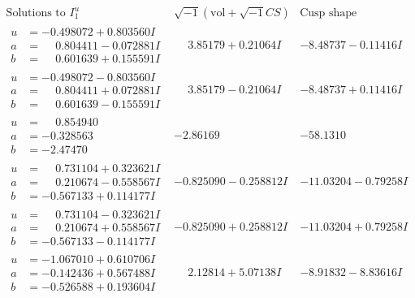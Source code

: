 \documentclass[1p]{elsarticle_modified}
\theoremstyle{definition}
\newcommand{\I}{\sqrt{-1}}
\begin{document}
$$\begin{array}{c|c|c}  
\text{Solutions to }I^u_{1}& \I (\text{vol} + \sqrt{-1}CS) & \text{Cusp shape}\\
 \hline 
\begin{aligned}
u &= -0.498072 + 0.803560 I \\
a &= \phantom{-}0.804411 - 0.072881 I \\
b &= \phantom{-}0.601639 + 0.155591 I\end{aligned}
 & \phantom{-}3.85179 + 0.21064 I & -8.48737 - 0.11416 I \\ \hline\begin{aligned}
u &= -0.498072 - 0.803560 I \\
a &= \phantom{-}0.804411 + 0.072881 I \\
b &= \phantom{-}0.601639 - 0.155591 I\end{aligned}
 & \phantom{-}3.85179 - 0.21064 I & -8.48737 + 0.11416 I \\ \hline\begin{aligned}
u &= \phantom{-}0.854940\phantom{ +0.000000I} \\
a &= -0.328563\phantom{ +0.000000I} \\
b &= -2.47470\phantom{ +0.000000I}\end{aligned}
 & -2.86169\phantom{ +0.000000I} & -58.1310\phantom{ +0.000000I} \\ \hline\begin{aligned}
u &= \phantom{-}0.731104 + 0.323621 I \\
a &= \phantom{-}0.210674 - 0.558567 I \\
b &= -0.567133 + 0.114177 I\end{aligned}
 & -0.825090 - 0.258812 I & -11.03204 - 0.79258 I \\ \hline\begin{aligned}
u &= \phantom{-}0.731104 - 0.323621 I \\
a &= \phantom{-}0.210674 + 0.558567 I \\
b &= -0.567133 - 0.114177 I\end{aligned}
 & -0.825090 + 0.258812 I & -11.03204 + 0.79258 I \\ \hline\begin{aligned}
u &= -1.067010 + 0.610706 I \\
a &= -0.142436 + 0.567488 I \\
b &= -0.526588 + 0.193604 I\end{aligned}
 & \phantom{-}2.12814 + 5.07138 I & -8.91832 - 8.83616 I \\ \hline\begin{aligned}

\end{aligned}
\end{array}$$
\end{document}
